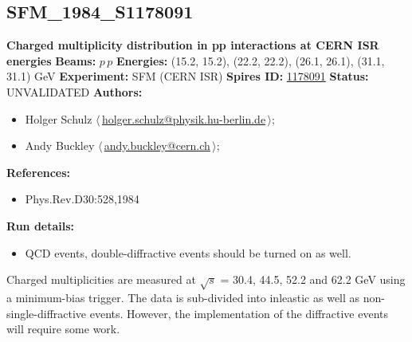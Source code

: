 \subsection[SFM\_1984\_S1178091]{SFM\_1984\_S1178091\,\cite{Breakstone:1983ns}}
\textbf{Charged multiplicity distribution in pp interactions at CERN ISR energies}\newline
\textbf{Beams:} $p$\,$p$ \newline
\textbf{Energies:} (15.2, 15.2), (22.2, 22.2), (26.1, 26.1), (31.1, 31.1) GeV \newline
\textbf{Experiment:} SFM (CERN ISR) \newline
\textbf{Spires ID:} \href{http://www.slac.stanford.edu/spires/find/hep/www?rawcmd=key+1178091}{1178091}\newline
\textbf{Status:} UNVALIDATED\newline
\textbf{Authors:}
\begin{itemize}
  \item Holger Schulz $\langle\,$\href{mailto:holger.schulz@physik.hu-berlin.de}{holger.schulz@physik.hu-berlin.de}$\,\rangle$;
  \item Andy Buckley $\langle\,$\href{mailto:andy.buckley@cern.ch}{andy.buckley@cern.ch}$\,\rangle$;
\end{itemize}
\textbf{References:}
\begin{itemize}
  \item Phys.Rev.D30:528,1984
\end{itemize}
\textbf{Run details:}
\begin{itemize}

  \item QCD events, double-diffractive events should be turned on as well.\end{itemize}

\noindent Charged multiplicities are measured at \ensuremath{\sqrt{s}} = 30.4, 44.5, 52.2 and 62.2 GeV using a minimum-bias trigger. The data is sub-divided into inleastic as well as non-single-diffractive events. However, the implementation of the diffractive events will require some work.

\clearpage


